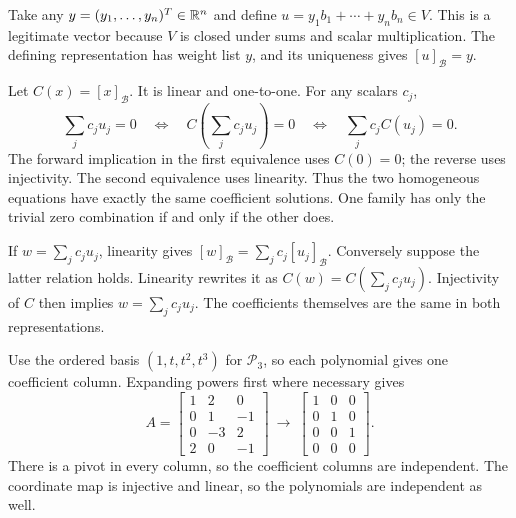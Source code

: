 Take any $y=(y_1,\ldots,y_n)^T\in\mathbb{R}^n$ and define
$u=y_1b_1+\cdots+y_nb_n\in V$. This is a legitimate vector because
$V$ is closed under sums and scalar multiplication. The defining
representation has weight list $y$, and its uniqueness gives
$[u]_{\mathcal B}=y$.

Let $C(x)=[x]_{\mathcal B}$. It is linear and one-to-one. For any
scalars $c_j$,
\[
\sum_jc_ju_j=0
\quad\Longleftrightarrow\quad
C\left(\sum_jc_ju_j\right)=0
\quad\Longleftrightarrow\quad
\sum_jc_jC(u_j)=0.
\]
The forward implication in the first equivalence uses $C(0)=0$;
the reverse uses injectivity. The second equivalence uses linearity.
Thus the two homogeneous equations have exactly the same coefficient
solutions. One family has only the trivial zero combination if and
only if the other does.

If $w=\sum_jc_ju_j$, linearity gives
$[w]_{\mathcal B}=\sum_jc_j[u_j]_{\mathcal B}$.
Conversely suppose the latter relation holds. Linearity rewrites it as
$C(w)=C(\sum_jc_ju_j)$. Injectivity of $C$ then implies
$w=\sum_jc_ju_j$. The coefficients themselves are the same in both
representations.

Use the ordered basis $(1,t,t^2,t^3)$ for $\mathcal P_3$, so each polynomial gives one coefficient column. Expanding powers first where necessary gives
\[A=\left[\begin{array}{rrr}1&2&0\\0&1&-1\\0&-3&2\\2&0&-1\end{array}\right]\ \longrightarrow\ \left[\begin{array}{rrr}1&0&0\\0&1&0\\0&0&1\\0&0&0\end{array}\right].\]
There is a pivot in every column, so the coefficient columns are independent. The coordinate map is injective and linear, so the polynomials are independent as well.

